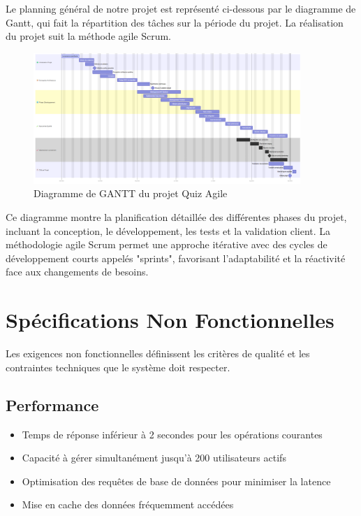 \documentclass[12pt,a4paper]{report}
\begin{document}
Le planning général de notre projet est représenté ci-dessous par le diagramme de Gantt, qui fait la répartition des tâches sur la période du projet. La réalisation du projet suit la méthode agile Scrum.

\begin{figure}[H]
\centering
\includegraphics[width=0.9\textwidth]{latex_media/media/image10.png}
\caption{Diagramme de GANTT du projet Quiz Agile}
\label{fig:gantt-quiz-agile}
\end{figure}

Ce diagramme montre la planification détaillée des différentes phases du projet, incluant la conception, le développement, les tests et la validation client. La méthodologie agile Scrum permet une approche itérative avec des cycles de développement courts appelés "sprints", favorisant l'adaptabilité et la réactivité face aux changements de besoins.

\section{Spécifications Non Fonctionnelles}

Les exigences non fonctionnelles définissent les critères de qualité et les contraintes techniques que le système doit respecter.

\subsection{Performance}

\begin{itemize}
\item Temps de réponse inférieur à 2 secondes pour les opérations courantes
\item Capacité à gérer simultanément jusqu'à 200 utilisateurs actifs
\item Optimisation des requêtes de base de données pour minimiser la latence
\item Mise en cache des données fréquemment accédées
\end{itemize}
\end{document}
